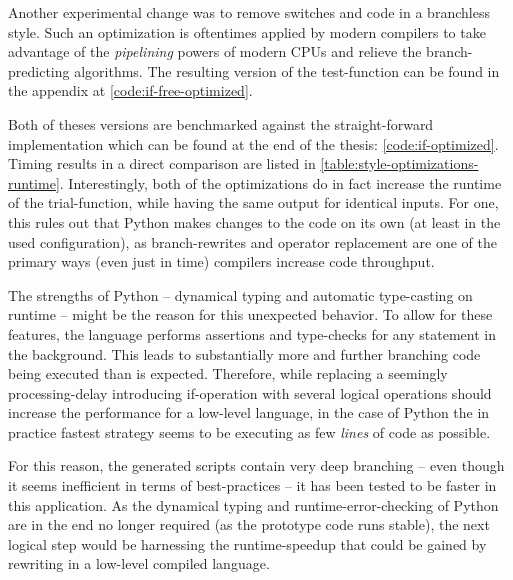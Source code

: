 Another experimental change was to remove switches and code in a branchless style.
Such an optimization is oftentimes applied by modern compilers to take advantage of the \emph{pipelining} powers of modern CPUs and relieve the branch-predicting algorithms.
The resulting version of the test-function can be found in the appendix at \ref{code:if-free-optimized}.

Both of theses versions are benchmarked against the straight-forward implementation which can be found at the end of the thesis: \ref{code:if-optimized}.
Timing results in a direct comparison are listed in \autoref{table:style-optimizations-runtime}.
Interestingly, both of the \glqq optimizations\grqq{} do in fact increase the runtime of the trial-function, while having the same output for identical inputs.
For one, this rules out that Python makes changes to the code on its own (at least in the used configuration), as branch-rewrites and operator replacement are one of the primary ways (even just in time) compilers increase code throughput.

The strengths of Python -- dynamical typing and automatic type-casting on runtime -- might be the reason for this unexpected behavior.
To allow for these features, the language performs assertions and type-checks for any statement in the background.
This leads to substantially more and further branching code being executed than is expected.
Therefore, while replacing a seemingly processing-delay introducing if-operation with several logical operations should increase the performance for a low-level language, in the case of Python the in practice fastest strategy seems to be executing as few \emph{lines} of code as possible.

For this reason, the generated scripts contain very deep branching -- even though it seems inefficient in terms of best-practices -- it has been tested to be faster in this application.
As the dynamical typing and runtime-error-checking of Python are in the end no longer required (as the prototype code runs stable), the next logical step would be harnessing the runtime-speedup that could be gained by rewriting in a low-level compiled language.